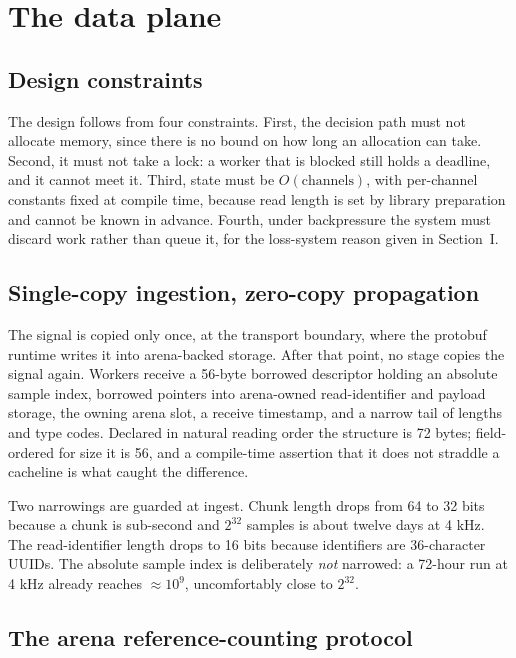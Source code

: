 \documentclass[conference]{IEEEtran}
\begin{document}
\section{The data plane}
\label{sec:plane}

\subsection{Design constraints}

The design follows from four constraints. First, the decision path must not allocate memory,
since there is no bound on how long an allocation can take. Second, it must not take a lock: a
worker that is blocked still holds a deadline, and it cannot meet it. Third, state must be
$O(\text{channels})$, with per-channel constants fixed at compile time, because read length is
set by library preparation and cannot be known in advance. Fourth, under backpressure the
system must discard work rather than queue it, for the loss-system reason given in Section~I.

\subsection{Single-copy ingestion, zero-copy propagation}

The signal is copied only once, at the transport boundary, where the protobuf runtime writes it
into arena-backed storage. After that point, no stage copies the signal again. Workers receive a 56-byte borrowed
descriptor holding an absolute sample index, borrowed pointers into arena-owned
read-identifier and payload storage, the owning arena slot, a receive timestamp, and a narrow
tail of lengths and type codes. Declared in natural reading order the structure is 72 bytes;
field-ordered for size it is 56, and a compile-time assertion that it does not straddle a
cacheline is what caught the difference.

Two narrowings are guarded at ingest. Chunk length drops from 64 to 32 bits because a chunk is
sub-second and $2^{32}$ samples is about twelve days at 4 kHz. The read-identifier length drops
to 16 bits because identifiers are 36-character UUIDs. The absolute sample index is
deliberately \emph{not} narrowed: a 72-hour run at 4 kHz already reaches ${\approx}10^9$,
uncomfortably close to $2^{32}$.

\subsection{The arena reference-counting protocol}
\end{document}
